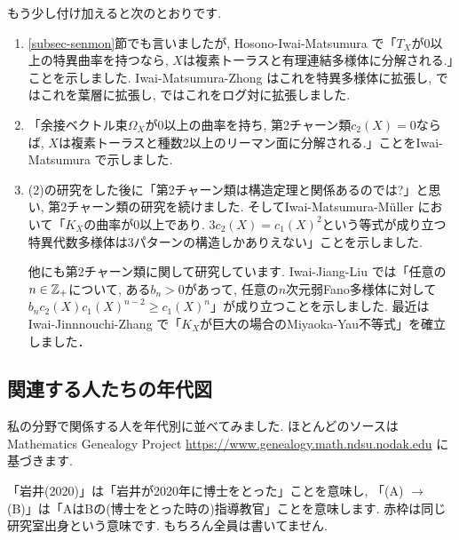 もう少し付け加えると次のとおりです. 
\begin{enumerate}[label=$(\arabic*)$]
  \setlength{\parskip}{0cm} %
  \setlength{\itemsep}{0cm} %
\item \ref{subsec-senmon}節でも言いましたが, Hosono-Iwai-Matsumura \cite{HIM22}で「$T_X$が0以上の特異曲率を持つなら, $X$は複素トーラスと有理連結多様体に分解される.」ことを示しました. Iwai-Matsumura-Zhong \cite{IMZ23}はこれを特異多様体に拡張し, \cite{Iwa22}ではこれを葉層に拡張し, \cite{Iwa21}ではこれをログ対に拡張しました. 
\item 「余接ベクトル束$\Omega_X$が0以上の曲率を持ち, 第2チャーン類$c_2(X)=0$ならば, $X$は複素トーラスと種数2以上のリーマン面に分解される.」ことをIwai-Matsumura \cite{IM22}で示しました. 
\item (2)の研究をした後に「第2チャーン類は構造定理と関係あるのでは?」と思い, 第2チャーン類の研究を続けました. そしてIwai-Matsumura-M\"uller \cite{IMM24} において「$K_X$の曲率が0以上であり. $3c_2(X) = c_1 (X)^{2}$という等式が成り立つ特異代数多様体は3パターンの構造しかありえない」ことを示しました.  

他にも第2チャーン類に関して研究しています. Iwai-Jiang-Liu \cite{IJL23}では「任意の$n \in \mathbb{Z}_+$について, ある$b_{n}>0$があって, 任意の$n$次元弱Fano多様体に対して$b_n c_2(X) c_1(X)^{n-2} \ge c_1(X)^{n}$」が成り立つことを示しました. 最近はIwai-Jinnnouchi-Zhang \cite{IJZ25}で「$K_X$が巨大の場合のMiyaoka-Yau不等式」を確立しました． 
\end{enumerate}



\subsection{関連する人たちの年代図}
\label{subsec-nendai}
私の分野で関係する人を年代別に並べてみました. ほとんどのソースはMathematics Genealogy Project \url{https://www.genealogy.math.ndsu.nodak.edu} に基づきます.

「岩井(2020)」は「岩井が2020年に博士をとった」ことを意味し,  「(A) $\to $ (B)」は「AはBの(博士をとった時の)指導教官」ことを意味します. 赤枠は同じ研究室出身という意味です. もちろん全員は書いてません. 

